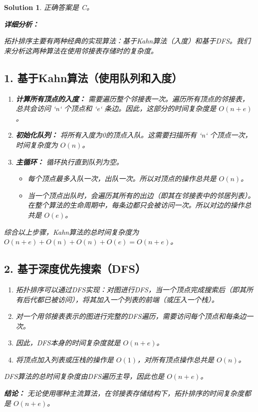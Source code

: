 \documentclass[UTF8]{report}
\newtheorem{solution}{Solution}
\theoremstyle{MyLineTheoremStyle} %
\theoremstyle{MyBlockTheoremStyle} %
\theoremstyle{MySubsubsectionStyle} %
\begin{document}
\begin{solution}
正确答案是 C。

\textbf{详细分析：}

拓扑排序主要有两种经典的实现算法：基于Kahn算法（入度）和基于DFS。我们来分析这两种算法在使用邻接表存储时的复杂度。

\subsection*{1. 基于Kahn算法（使用队列和入度）}
\begin{enumerate}
    \item \textbf{计算所有顶点的入度：}
    需要遍历整个邻接表一次。遍历所有顶点的邻接表，总共会访问 `n` 个顶点和 `e` 条边。因此，这部分的时间复杂度是 $O(n+e)$。

    \item \textbf{初始化队列：}
    将所有入度为0的顶点入队。这需要扫描所有 `n` 个顶点一次，时间复杂度为 $O(n)$。

    \item \textbf{主循环：}
    循环执行直到队列为空。
    \begin{itemize}
        \item 每个顶点最多入队一次，出队一次。所以对顶点的操作总共是 $O(n)$。
        \item 当一个顶点出队时，会遍历其所有的出边（即其在邻接表中的邻居列表）。在整个算法的生命周期中，每条边都只会被访问一次。所以对边的操作总共是 $O(e)$。
    \end{itemize}
\end{enumerate}
综合以上步骤，Kahn算法的总时间复杂度为 $O(n+e) + O(n) + O(n) + O(e) = O(n+e)$。

\subsection*{2. 基于深度优先搜索（DFS）}
\begin{enumerate}
    \item 拓扑排序可以通过DFS实现：对图进行DFS，当一个顶点完成搜索后（即其所有后代都已被访问），将其加入一个列表的前端（或压入一个栈）。
    \item 对一个用邻接表表示的图进行完整的DFS遍历，需要访问每个顶点和每条边一次。
    \item 因此，DFS本身的时间复杂度就是 $O(n+e)$。
    \item 将顶点加入列表或压栈的操作是 $O(1)$，对所有顶点操作总共是 $O(n)$。
\end{enumerate}
DFS算法的总时间复杂度由DFS遍历主导，因此也是 $O(n+e)$。

\textbf{结论：}
无论使用哪种主流算法，在邻接表存储结构下，拓扑排序的时间复杂度都是 $O(n+e)$。
\end{solution}
\end{document}
